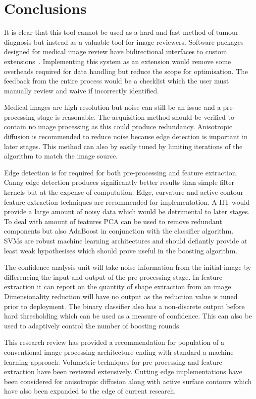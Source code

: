 \documentclass[journal]{IEEEtran}
\begin{document}
\section{Conclusions}
\label{sec:conclusions}

It is clear that this tool cannot be used as a hard and fast method of tumour diagnosis but instead as a valuable tool for image reviewers.
Software packages designed for medical image review have bidirectional interfaces to custom extensions~\cite{slicer}.
Implementing this system as an extension would remove some overheads required for data handling but reduce the scope for optimisation.
The feedback from the entire process would be a checklist which the user must manually review and waive if incorrectly identified.

Medical images are high resolution but noise can still be an issue and a pre-processing stage is reasonable.
The acquisition method should be verified to contain no image processing as this could produce redundancy.
Anisotropic diffusion is recommended to reduce noise because edge detection is important in later stages.
This method can also by easily tuned by limiting iterations of the algorithm to match the image source.

Edge detection is for required for both pre-processing and feature extraction.
Canny edge detection produces significantly better results than simple filter kernels but at the expense of computation.
Edge, curvature and active contour feature extraction techniques are recommended for implementation.
A HT would provide a large amount of noisy data which would be detrimental to later stages.
To deal with amount of features PCA can be used to remove redundant components but also AdaBoost in conjunction with the classifier algorithm.
SVMs are robust machine learning architectures and should defiantly provide at least weak hypothesises which should prove useful in the boosting algorithm. 


The confidence analysis unit will take noise information from the initial image by differencing the input and output of the pre-processing stage.
In feature extraction it can report on the quantity of shape extraction from an image. 
Dimensionality reduction will have no output as the reduction value is tuned prior to deployment.
The binary classifier also has a non-discrete output before hard thresholding which can be used as a measure of confidence.
This can also be used to adaptively control the number of boosting rounds.


This research review has provided a recommendation for population of a conventional image processing architecture ending with standard a machine learning approach.
Volumetric techniques for pre-processing and feature extraction have been reviewed extensively. 
Cutting edge implementations have been considered for anisotropic diffusion along with active surface contours which have also been expanded to the edge of current research.




\end{document}
